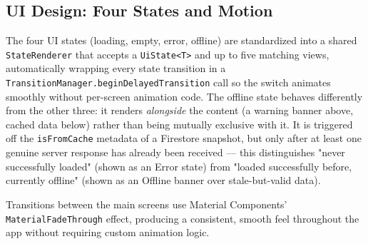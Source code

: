 \subsection{UI Design: Four States and Motion}

The four UI states (loading, empty, error, offline) are standardized into a shared \texttt{StateRenderer} that accepts a \texttt{UiState<T>} and up to five matching views, automatically wrapping every state transition in a \texttt{TransitionManager.beginDelayedTransition} call so the switch animates smoothly without per-screen animation code. The offline state behaves differently from the other three: it renders \emph{alongside} the content (a warning banner above, cached data below) rather than being mutually exclusive with it. It is triggered off the \texttt{isFromCache} metadata of a Firestore snapshot, but only after at least one genuine server response has already been received — this distinguishes "never successfully loaded" (shown as an Error state) from "loaded successfully before, currently offline" (shown as an Offline banner over stale-but-valid data).

Transitions between the main screens use Material Components' \texttt{MaterialFadeThrough} effect, producing a consistent, smooth feel throughout the app without requiring custom animation logic.
